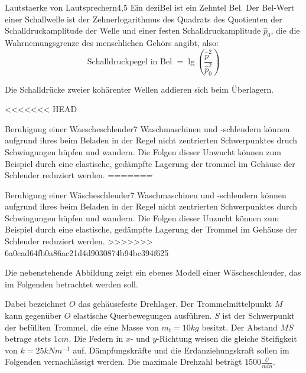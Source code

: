 \begin{problem}{Lautstaerke von Lautsprechern}{4,5}
\hinweis Ein deziBel ist ein Zehntel Bel.  Der Bel-Wert einer Schallwelle ist der Zehnerlogarithmus des Quadrats des Quotienten der Schalldruckamplitude der Welle und einer festen Schalldruckamplitude $\hat{p}_0$, die die Wahrnemungsgrenze des menschlichen Gehörs angibt, also:
\begin{equation*}
  \mbox{Schalldruckpegel in Bel\ } = \lg\left(\frac{\hat{p}^2}{\hat{p}_0^2}\right)
\end{equation*}

Die Schalldrücke zweier kohärenter Wellen addieren sich beim Überlagern.
\begin{solution}
  
\end{solution}
\end{problem}

<<<<<<< HEAD
\begin{problem}{Beruhigung einer Waescheschleuder}{7}
  Waschmaschinen und -schleudern können aufgrund ihres beim Beladen in der Regel nicht zentrierten Schwerpunktes druch Schwingungen hüpfen und wandern.  Die Folgen dieser Unwucht können zum Beispiel durch eine elastische, gedämpfte Lagerung der trommel im Gehäuse der Schleuder reduziert werden.
=======
\begin{problem}{Beruhigung einer Wäscheschleuder}{7}
  Waschmaschinen und -schleudern können aufgrund ihres beim Beladen in der Regel nicht zentrierten Schwerpunktes durch Schwingungen hüpfen und wandern.  Die Folgen dieser Unzucht können zum Beispiel durch eine elastische, gedämpfte Lagerung der Trommel im Gehäuse der Schleuder reduziert werden.
>>>>>>> 6a0cad64fb0a86ac21d4d9030874b94bc394f625

Die nebenstehende Abbildung zeigt ein ebenes Modell einer Wäscheschleuder, das im Folgenden betrachtet werden soll.


Dabei bezeichnet $O$ das gehäusefeste Drehlager.  Der Trommelmittelpunkt $M$ kann gegenüber $O$ elastische Querbewegungen ausführen.  $S$ ist der Schwerpunkt der befüllten Trommel, die eine Masse von $m_t=10\unit{kg}$ besitzt.  Der Abstand $MS$ betrage stets $1\unit{cm}$.  Die Federn in $x$- und $y$-Richtung weisen die gleiche Steifigkeit von $k=25\unit{kNm^{-1}}$ auf.  Dämpfungskräfte und die Erdanziehungskraft sollen im Folgenden vernachlässigt werden.  Die maximale Drehzahl beträgt $1500\unit{\frac U{min}}$.


\end{problem}
\end{problem}
